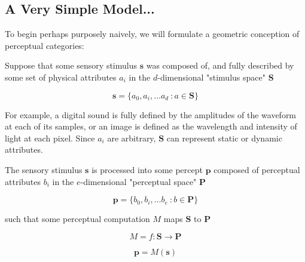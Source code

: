 \begin{multicols}{2}

\subsection{A Very Simple Model...}

To begin perhaps purposely naively, we will formulate a geometric conception of perceptual categories:

Suppose that some sensory stimulus $\mathbf{s}$ was composed of, and fully described by some set of physical attributes $a_i$ in the $d$-dimensional "stimulus space" $\mathbf{S}$

\begin{equation}
\label{eqn:s}
\mathbf{s} = \{a_0, a_i, \dots a_d\ : a \in \mathbf{S}\}
\end{equation}

For example, a digital sound is fully defined by the amplitudes of the waveform at each of its samples, or an image is defined as the wavelength and intensity of light at each pixel. Since $a_i$ are arbitrary, $\mathbf{S}$ can represent static or dynamic attributes. 

The sensory stimulus $\mathbf{s}$ is processed into some percept $\mathbf{p}$ composed of perceptual attributes $b_i$ in the $e$-dimensional "perceptual space" $\mathbf{P}$

\begin{equation}
\label{eqn:p}
\mathbf{p} = \{b_0, b_i, \dots b_e\ : b \in \mathbf{P}\}
\end{equation}

such that some perceptual computation $M$ maps $\mathbf{S}$ to $\mathbf{P}$

\begin{equation}
\label{eqn:map}
M = f: \mathbf{S} \to \mathbf{P}
\end{equation} 

\begin{equation}
\label{eqn:pfroms}
\mathbf{p} = M(\mathbf{s})
\end{equation}


\end{multicols}
